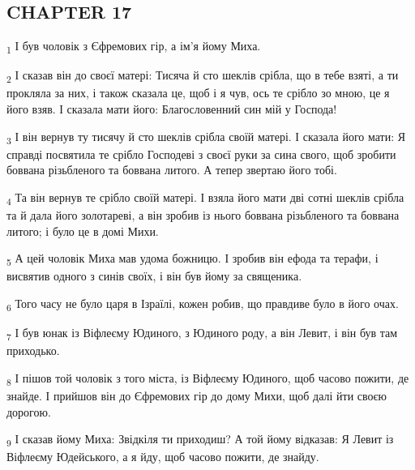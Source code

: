 \subsection{CHAPTER 17}
\begin{tcolorbox}
\textsubscript{1} І був чоловік з Єфремових гір, а ім'я йому Миха.
\end{tcolorbox}
\begin{tcolorbox}
\textsubscript{2} І сказав він до своєї матері: Тисяча й сто шеклів срібла, що в тебе взяті, а ти прокляла за них, і також сказала це, щоб і я чув, ось те срібло зо мною, це я його взяв. І сказала мати його: Благословенний син мій у Господа!
\end{tcolorbox}
\begin{tcolorbox}
\textsubscript{3} І він вернув ту тисячу й сто шеклів срібла своїй матері. І сказала його мати: Я справді посвятила те срібло Господеві з своєї руки за сина свого, щоб зробити боввана різьбленого та боввана литого. А тепер звертаю його тобі.
\end{tcolorbox}
\begin{tcolorbox}
\textsubscript{4} Та він вернув те срібло своїй матері. І взяла його мати дві сотні шеклів срібла та й дала його золотареві, а він зробив із нього боввана різьбленого та боввана литого; і було це в домі Михи.
\end{tcolorbox}
\begin{tcolorbox}
\textsubscript{5} А цей чоловік Миха мав удома божницю. І зробив він ефода та терафи, і висвятив одного з синів своїх, і він був йому за священика.
\end{tcolorbox}
\begin{tcolorbox}
\textsubscript{6} Того часу не було царя в Ізраїлі, кожен робив, що правдиве було в його очах.
\end{tcolorbox}
\begin{tcolorbox}
\textsubscript{7} І був юнак із Віфлеєму Юдиного, з Юдиного роду, а він Левит, і він був там приходько.
\end{tcolorbox}
\begin{tcolorbox}
\textsubscript{8} І пішов той чоловік з того міста, із Віфлеєму Юдиного, щоб часово пожити, де знайде. І прийшов він до Єфремових гір до дому Михи, щоб далі йти своєю дорогою.
\end{tcolorbox}
\begin{tcolorbox}
\textsubscript{9} І сказав йому Миха: Звідкіля ти приходиш? А той йому відказав: Я Левит із Віфлеєму Юдейського, а я йду, щоб часово пожити, де знайду.
\end{tcolorbox}

